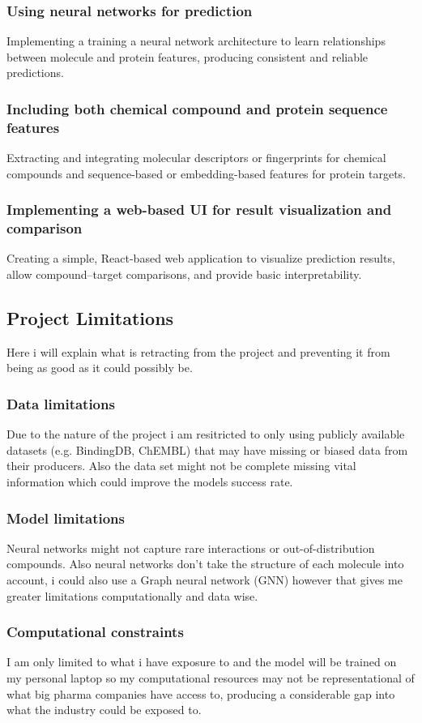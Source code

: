 \subsubsection{Using neural networks for prediction}
Implementing a training a neural network architecture to learn relationships between molecule and protein features, producing consistent and reliable predictions.
\subsubsection{Including both chemical compound and protein sequence features}
Extracting and integrating molecular descriptors or fingerprints for chemical compounds and sequence-based or embedding-based features for protein targets.
\subsubsection{Implementing a web-based UI for result visualization and comparison}
Creating a simple, React-based web application to visualize prediction results, allow compound–target comparisons, and provide basic interpretability.

\subsection{Project Limitations}
Here i will explain what is retracting from the project and preventing it from being as good as it could possibly be.
\subsubsection{Data limitations}
Due to the nature of the project i am resitricted to only using publicly available datasets (e.g. BindingDB, ChEMBL) that may have missing or biased data from their producers. Also the data set might not be complete missing vital information which could improve the models success rate.
\subsubsection{Model limitations} Neural networks might not capture rare interactions or out-of-distribution compounds. Also neural networks don't take the structure of each molecule into account, i could also use a Graph neural network (GNN) however that gives me greater limitations computationally and data wise.
\subsubsection{Computational constraints} 
I am only limited to what i have exposure to and the model will be trained on my personal laptop so my computational resources may not be representational of what big pharma companies have access to, producing a considerable gap into what the industry could be exposed to.
